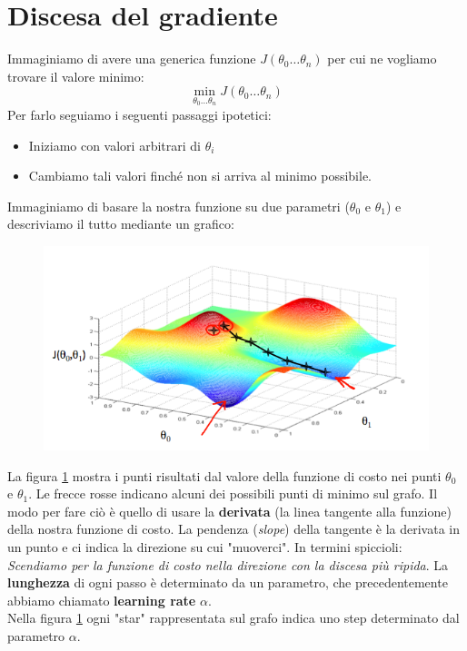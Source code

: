 \section{Discesa del gradiente}
Immaginiamo di avere una generica funzione $J(\theta_0 \dots \theta_n)$ per cui ne vogliamo trovare il valore minimo:
\[\min_{\theta_0 \dots \theta_n} J(\theta_0 \dots \theta_n)\]
Per farlo seguiamo i seguenti passaggi ipotetici:
\begin{itemize}
    \item Iniziamo con valori arbitrari di $\theta_i$
    \item Cambiamo tali valori finché non si arriva al minimo possibile.
\end{itemize}
Immaginiamo di basare la nostra funzione su due parametri ($\theta_0$ e $\theta_1$) e descriviamo il tutto mediante un grafico:
\begin{figure}[h!]
    \centering
    \includegraphics[width=1\textwidth]{img/bn9SyaDIEeav5QpTGIv-Pg_0d06dca3d225f3de8b5a4a7e92254153_Screenshot-2016-11-01-23.48.26.png}
    \caption{}\label{GradientDescent1}
\end{figure}
La figura \ref{GradientDescent1} mostra i punti risultati dal valore della funzione di costo nei punti $\theta_0$ e $\theta_1$. Le frecce rosse indicano alcuni dei possibili punti di minimo sul grafo. Il modo per fare ciò è quello di usare la \textbf{derivata} (la linea tangente alla funzione) della nostra funzione di costo. La pendenza (\textit{slope}) della tangente è la derivata in un punto e ci indica la direzione su cui "muoverci". In termini spiccioli: \textit{Scendiamo per la funzione di costo nella direzione con la discesa più ripida}. La \textbf{lunghezza} di ogni passo è determinato da un parametro, che precedentemente abbiamo chiamato \textbf{learning rate} $\alpha$. \\ Nella figura \ref{GradientDescent1} ogni "star" rappresentata sul grafo indica uno step determinato dal parametro $\alpha$. 
